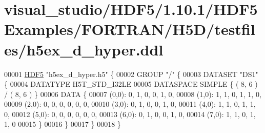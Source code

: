 \hypertarget{visual__studio_2_h_d_f5_21_810_81_2_h_d_f5_examples_2_f_o_r_t_r_a_n_2_h5_d_2testfiles_2h5ex__d__hyper_8ddl_source}{}\section{visual\+\_\+studio/\+H\+D\+F5/1.10.1/\+H\+D\+F5\+Examples/\+F\+O\+R\+T\+R\+A\+N/\+H5\+D/testfiles/h5ex\+\_\+d\+\_\+hyper.ddl}
\label{visual__studio_2_h_d_f5_21_810_81_2_h_d_f5_examples_2_f_o_r_t_r_a_n_2_h5_d_2testfiles_2h5ex__d__hyper_8ddl_source}

\begin{DoxyCode}
00001 \hyperlink{namespace_h_d_f5}{HDF5} \textcolor{stringliteral}{"h5ex\_d\_hyper.h5"} \{
00002 GROUP \textcolor{stringliteral}{"/"} \{
00003    DATASET \textcolor{stringliteral}{"DS1"} \{
00004       DATATYPE  H5T\_STD\_I32LE
00005       DATASPACE  SIMPLE \{ ( 8, 6 ) / ( 8, 6 ) \}
00006       DATA \{
00007       (0,0): 0, 1, 0, 0, 1, 0,
00008       (1,0): 1, 1, 0, 1, 1, 0,
00009       (2,0): 0, 0, 0, 0, 0, 0,
00010       (3,0): 0, 1, 0, 0, 1, 0,
00011       (4,0): 1, 1, 0, 1, 1, 0,
00012       (5,0): 0, 0, 0, 0, 0, 0,
00013       (6,0): 0, 1, 0, 0, 1, 0,
00014       (7,0): 1, 1, 0, 1, 1, 0
00015       \}
00016    \}
00017 \}
00018 \}
\end{DoxyCode}
